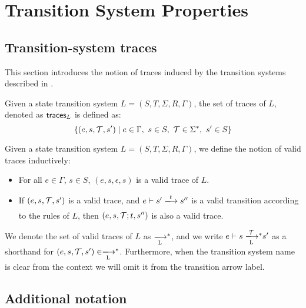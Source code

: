 \section{Transition System Properties}
\label{sec:ts-properties}


\subsection{Transition-system traces}
\label{sec:ts-traces}

This section introduces the notion of traces induced by the transition systems
described in \cite{small_step_semantics}.

\begin{definition}[Traces]
  Given a state transition system $L=(S,T,\Sigma, R, \Gamma)$, the set of
  traces of $L$, denoted as $\mathsf{traces}_L$ is defined as:
  $$
  \{ (e, s, \mathcal{T}, s') \mid e \in \Gamma,~ s \in S,~ \mathcal{T} \in \Sigma^{*},~ s' \in S\}
  $$

\end{definition}


\begin{definition}
  Given a state transition system $L=(S,T,\Sigma, R, \Gamma)$, we define the
  notion of valid traces inductively:

  \begin{itemize}
  \item For all $e \in \Gamma$, $s \in S$, $(e, s, \epsilon, s)$ is a valid
    trace of $L$.

  \item If $(e, s, \mathcal{T}, s')$ is a valid trace, and
    $e \vdash s' \trans{}{\var{t}} s''$ is a valid transition according to the
    rules of $L$, then $(e, s, \mathcal{T}; t, s'')$ is also a valid trace.
  \end{itemize}

\end{definition}

We denote the set of valid traces of $L$ as $\transtar{L}{}$, and we write
$e \vdash s \transtar{L}{\txs} s'$ as a shorthand for
$(e, s, \txs, s') \in \transtar{L}{}$. Furthermore, when the transition system
name is clear from the context we will omit it from the transition arrow label.

\subsection{Additional notation}
\label{sec:additional-notation}

